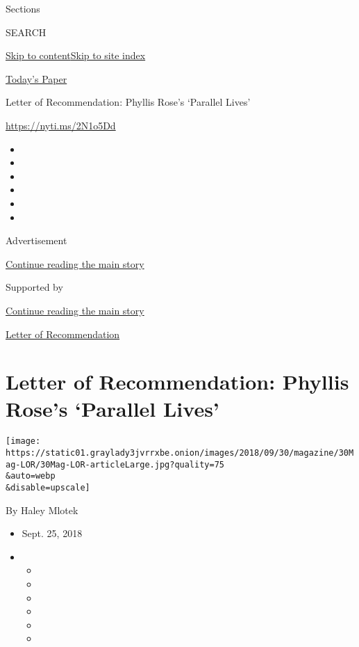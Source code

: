Sections

SEARCH

\protect\hyperlink{site-content}{Skip to
content}\protect\hyperlink{site-index}{Skip to site index}

\href{https://myaccount.nytimes3xbfgragh.onion/auth/login?response_type=cookie\&client_id=vi}{}

\href{https://www.nytimes3xbfgragh.onion/section/todayspaper}{Today's
Paper}

Letter of Recommendation: Phyllis Rose's `Parallel Lives'

\url{https://nyti.ms/2N1o5Dd}

\begin{itemize}
\item
\item
\item
\item
\item
\item
\end{itemize}

Advertisement

\protect\hyperlink{after-top}{Continue reading the main story}

Supported by

\protect\hyperlink{after-sponsor}{Continue reading the main story}

\href{/column/letter-of-recommendation}{Letter of Recommendation}

\hypertarget{letter-of-recommendation-phyllis-roses-parallel-lives}{%
\section{Letter of Recommendation: Phyllis Rose's `Parallel
Lives'}\label{letter-of-recommendation-phyllis-roses-parallel-lives}}

\texttt{[image: https://static01.graylady3jvrrxbe.onion/images/2018/09/30/magazine/30Mag-LOR/30Mag-LOR-articleLarge.jpg?quality=75\\\&auto=webp\\\&disable=upscale]}

By Haley Mlotek

\begin{itemize}
\item
  Sept. 25, 2018
\item
  \begin{itemize}
  \item
  \item
  \item
  \item
  \item
  \item
  \end{itemize}
\end{itemize}

